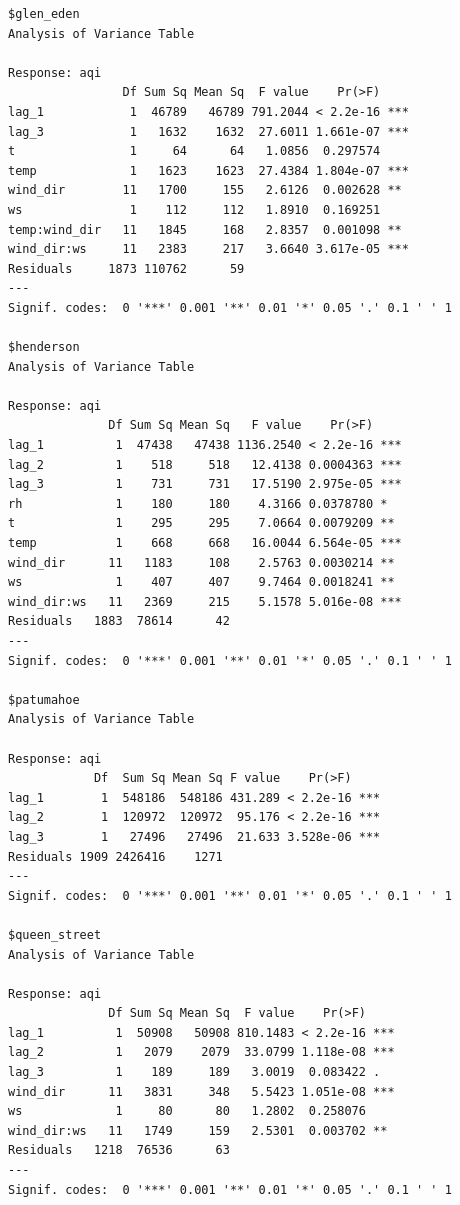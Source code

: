 \documentclass{aucklandthesis}
\begin{document}
\begin{verbatim}
$glen_eden
Analysis of Variance Table

Response: aqi
                Df Sum Sq Mean Sq  F value    Pr(>F)    
lag_1            1  46789   46789 791.2044 < 2.2e-16 ***
lag_3            1   1632    1632  27.6011 1.661e-07 ***
t                1     64      64   1.0856  0.297574    
temp             1   1623    1623  27.4384 1.804e-07 ***
wind_dir        11   1700     155   2.6126  0.002628 ** 
ws               1    112     112   1.8910  0.169251    
temp:wind_dir   11   1845     168   2.8357  0.001098 ** 
wind_dir:ws     11   2383     217   3.6640 3.617e-05 ***
Residuals     1873 110762      59                       
---
Signif. codes:  0 '***' 0.001 '**' 0.01 '*' 0.05 '.' 0.1 ' ' 1

$henderson
Analysis of Variance Table

Response: aqi
              Df Sum Sq Mean Sq   F value    Pr(>F)    
lag_1          1  47438   47438 1136.2540 < 2.2e-16 ***
lag_2          1    518     518   12.4138 0.0004363 ***
lag_3          1    731     731   17.5190 2.975e-05 ***
rh             1    180     180    4.3166 0.0378780 *  
t              1    295     295    7.0664 0.0079209 ** 
temp           1    668     668   16.0044 6.564e-05 ***
wind_dir      11   1183     108    2.5763 0.0030214 ** 
ws             1    407     407    9.7464 0.0018241 ** 
wind_dir:ws   11   2369     215    5.1578 5.016e-08 ***
Residuals   1883  78614      42                        
---
Signif. codes:  0 '***' 0.001 '**' 0.01 '*' 0.05 '.' 0.1 ' ' 1

$patumahoe
Analysis of Variance Table

Response: aqi
            Df  Sum Sq Mean Sq F value    Pr(>F)    
lag_1        1  548186  548186 431.289 < 2.2e-16 ***
lag_2        1  120972  120972  95.176 < 2.2e-16 ***
lag_3        1   27496   27496  21.633 3.528e-06 ***
Residuals 1909 2426416    1271                      
---
Signif. codes:  0 '***' 0.001 '**' 0.01 '*' 0.05 '.' 0.1 ' ' 1

$queen_street
Analysis of Variance Table

Response: aqi
              Df Sum Sq Mean Sq  F value    Pr(>F)    
lag_1          1  50908   50908 810.1483 < 2.2e-16 ***
lag_2          1   2079    2079  33.0799 1.118e-08 ***
lag_3          1    189     189   3.0019  0.083422 .  
wind_dir      11   3831     348   5.5423 1.051e-08 ***
ws             1     80      80   1.2802  0.258076    
wind_dir:ws   11   1749     159   2.5301  0.003702 ** 
Residuals   1218  76536      63                       
---
Signif. codes:  0 '***' 0.001 '**' 0.01 '*' 0.05 '.' 0.1 ' ' 1


\end{verbatim}
\end{document}
